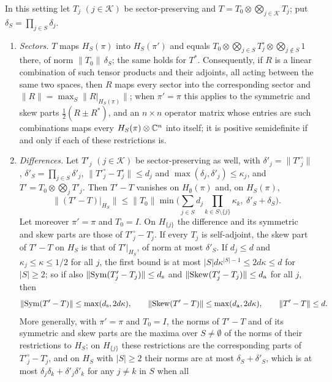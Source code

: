 \begin{lemma}\label{lem:sector}
In this setting let $T_j$ $(j\in\mathcal K)$ be sector-preserving and
$T=T_0\otimes\bigotimes_{j\in\mathcal K}T_j$; put $\delta_S=\prod_{j\in S}\delta_j$.
\begin{enumerate}[label=(\alph*)]
\item\emph{Sectors.} $T$ maps $H_S(\pi)$ into $H_S(\pi')$ and equals
 $T_0\otimes\bigotimes_{j\in S}T_j^\circ\otimes\bigotimes_{j\notin S}1$ there,
 of norm $\|T_0\|\,\delta_S$; the same holds for $T^*$. Consequently, if $R$ is
 a linear combination of such tensor products and their adjoints, all acting
 between the same two spaces, then $R$ maps every sector into the
 corresponding sector and $\|R\|=\max_S\|R|_{H_S(\pi)}\|$; when $\pi'=\pi$ this
 applies to the symmetric and skew parts $\frac12(R\pm R^*)$, and an
 $n\times n$ operator matrix whose entries are such combinations maps every
 $H_S(\pi)\otimes\mathbb C^n$ into itself; it is positive semidefinite if and only if
 each of these restrictions is.
\item\emph{Differences.} Let $T'_j$ $(j\in\mathcal K)$ be sector-preserving
 as well, with $\delta'_j=\|T'^\circ_j\|$, $\delta'_S=\prod_{j\in S}\delta'_j$,
 $\|T'^\circ_j-T^\circ_j\|\le d_j$ and $\max(\delta_j,\delta'_j)\le\kappa_j$, and
 $T'=T_0\otimes\bigotimes_jT'_j$.
 Then $T'-T$ vanishes on $H_\emptyset(\pi)$ and, on $H_S(\pi)$,
 \[
  \|(T'-T)|_{H_S}\|\le\|T_0\|\min\Big(\sum_{j\in S}d_j\!\!\prod_{k\in S\setminus\{j\}}\!\!\kappa_k,\
  \delta'_S+\delta_S\Big).
 \]
 Let moreover $\pi'=\pi$ and $T_0=I$. On $H_{\{j\}}$ the difference and its
 symmetric and skew parts are those of $T'^\circ_j-T^\circ_j$. If every $T_j$
 is self-adjoint, the skew part of $T'-T$ on $H_S$ is that of $T'|_{H_S}$, of
 norm at most $\delta'_S$. If $d_j\le d$ and $\kappa_j\le\kappa\le1/2$ for all
 $j$, the first bound is at most $|S|d\kappa^{|S|-1}\le2d\kappa\le d$ for
 $|S|\ge2$; so if also $\|\mathrm{Sym}(T'_j-T_j)\|\le d_{\rm s}$ and
 $\|\mathrm{Skew}(T'_j-T_j)\|\le d_{\rm a}$ for all $j$, then
 \[
  \|\mathrm{Sym}(T'-T)\|\le\max(d_{\rm s},2d\kappa),\qquad
  \|\mathrm{Skew}(T'-T)\|\le\max(d_{\rm a},2d\kappa),\qquad\|T'-T\|\le d .
 \]
 More generally, with $\pi'=\pi$ and $T_0=I$, the norms of $T'-T$ and of its
 symmetric and skew parts are the maxima over $S\ne\emptyset$ of the norms of
 their restrictions to $H_S$; on $H_{\{j\}}$ these restrictions are the
 corresponding parts of $T'^\circ_j-T^\circ_j$, and on $H_S$ with $|S|\ge2$
 their norms are at most $\delta_S+\delta'_S$, which is at most
 $\delta_j\delta_k+\delta'_j\delta'_k$ for any $j\ne k$ in $S$ when all

\end{enumerate}
\end{lemma}
